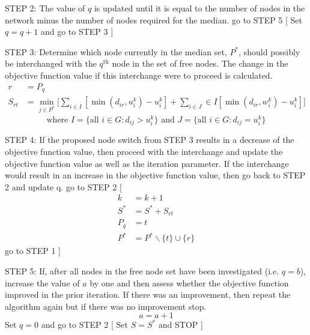 \documentclass[11pt]{article}
\begin{document}
\begin{algorithm}
\begin{algorithmic}[0]

			
			\Statex 
			\Statex STEP 2: The value of $q$ is updated until it is equal to the number of nodes in the network minus the number of nodes required for the median.
			\Statex go to STEP 5
			[
			\Else
			\Statex Set $q=q+1$ and go to STEP 3
			]
			\EndIf
			
			\Statex 
			\Statex STEP 3: Determine which node currently in the median set, $P^*$, should possibly be interchanged with the $q^{\text{th}}$ node in the set of free nodes.  The change in the objective function value if this interchange were to proceed is calculated.
			\begin{align*}
			r &= P_q\\
			S_{rt} & = \min_{j\in P^*}\big[\sum_{i\in I}[\min(d_{ir},u_i^k)-u_i^k] + \sum_{i\in J}\in I[\min(d_{ir},w_i^k)-u_i^k] \big]
			\end{align*}
			\begin{equation*}
			\text{where } I = \{\text{all } i \in G: d_{ij} > u_i^k\} \text{ and } J = \{\text{all } i \in G: d_{ij} = u_i^k\}
			\end{equation*}
			
			\Statex 
			\Statex STEP 4: If the proposed node switch from STEP 3 results in a decrease of the objective function value, then proceed with the interchange and update the objective function value as well as the  iteration parameter.  If the interchange would result in an increase in the objective function value, then go back to STEP 2 and update q.
			\Statex go to STEP 2
			[
			\begin{align*}
			k &= k+1\\
			S^* &= S^* + S_{rt}\\
			P_q &= t\\
			P^* & = P^*\backslash \{t\} \cup \{r\}		
			\end{align*}
			\Statex go to STEP 1				
			]
			\EndIf

\Statex	
{}
\end{algorithmic}
\end{algorithm}

\begin{algorithm}
\begin{algorithmic}[0]
			
			\Statex 
			\Statex STEP 5: If, after all nodes in the free node set have been investigated (i.e. $q=b$), increase the value of $a$ by one and then assess whether the objective function improved in the prior iteration.  If there was an improvement, then repeat the algorithm again but if there was no improvement stop.
			\begin{equation*}
			a = a+1
			\end{equation*}
			\Statex Set $q=0$ and go to STEP 2
			[
			\Statex Set $S=S^*$ and STOP
			]
			\EndIf
			
			
		\end{algorithmic}
	\end{algorithm}
\end{document}
